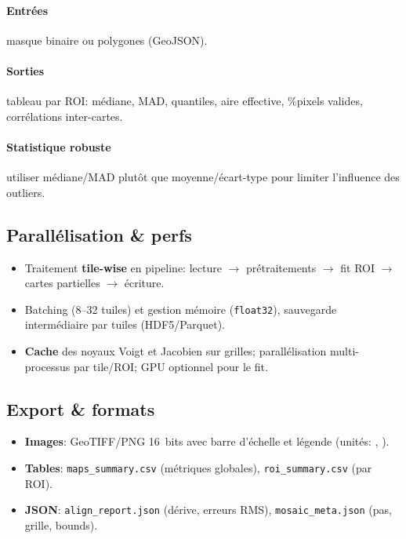 \paragraph{Entrées} masque binaire ou polygones (GeoJSON). \paragraph{Sorties} tableau par ROI: médiane, MAD, quantiles, aire effective, \%pixels valides, corrélations inter-cartes. \paragraph{Statistique robuste} utiliser médiane/MAD plutôt que moyenne/écart-type pour limiter l'influence des outliers.

\subsection{Parallélisation \& perfs}
\begin{itemize}[nosep]
\item Traitement \textbf{tile-wise} en pipeline: lecture $\rightarrow$ prétraitements $\rightarrow$ fit ROI $\rightarrow$ cartes partielles $\rightarrow$ écriture.
\item Batching (8--32 tuiles) et gestion mémoire (\texttt{float32}), sauvegarde intermédiaire par tuiles (HDF5/Parquet).
\item \textbf{Cache} des noyaux Voigt et Jacobien sur grilles; parallélisation multi-processus par tile/ROI; GPU optionnel pour le fit.
\end{itemize}

\subsection{Export \& formats}
\begin{itemize}[nosep]
\item \textbf{Images}: GeoTIFF/PNG 16~bits avec barre d'échelle et légende (unités: \cm, \um).
\item \textbf{Tables}: \texttt{maps\_summary.csv} (métriques globales), \texttt{roi\_summary.csv} (par ROI).
\item \textbf{JSON}: \texttt{align\_report.json} (dérive, erreurs RMS), \texttt{mosaic\_meta.json} (pas, grille, bounds).
\end{itemize}

